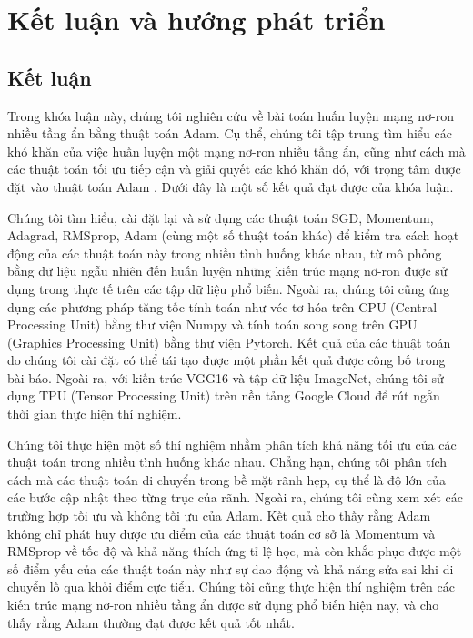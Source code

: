 \chapter{Kết luận và hướng phát triển}
\label{Chapter5}

\section{Kết luận}

Trong khóa luận này, chúng tôi nghiên cứu về bài toán huấn luyện mạng nơ-ron nhiều tầng ẩn bằng thuật toán Adam. Cụ thể, chúng tôi tập trung tìm hiểu các khó khăn của việc huấn luyện một mạng nơ-ron nhiều tầng ẩn, cũng như cách mà các thuật toán tối ưu tiếp cận và giải quyết các khó khăn đó, với trọng tâm được đặt vào thuật toán Adam \cite{kingma2014adam}. Dưới đây là một số kết quả đạt được của khóa luận.

Chúng tôi tìm hiểu, cài đặt lại và sử dụng các thuật toán SGD, Momentum, Adagrad, RMSprop, Adam (cùng một số thuật toán khác) để kiểm tra cách hoạt động của các thuật toán này trong nhiều tình huống khác nhau, từ mô phỏng bằng dữ liệu ngẫu nhiên đến huấn luyện những kiến trúc mạng nơ-ron được sử dụng trong thực tế trên các tập dữ liệu phổ biến. Ngoài ra, chúng tôi cũng ứng dụng các phương pháp tăng tốc tính toán như véc-tơ hóa trên CPU (Central Processing Unit) bằng thư viện Numpy và tính toán song song trên GPU (Graphics Processing Unit) bằng thư viện Pytorch. Kết quả của các thuật toán do chúng tôi cài đặt có thể tái tạo được một phần kết quả được công bố trong bài báo. Ngoài ra, với kiến trúc VGG16 và tập dữ liệu ImageNet, chúng tôi sử dụng TPU (Tensor Processing Unit) trên nền tảng Google Cloud để rút ngắn thời gian thực hiện thí nghiệm.

Chúng tôi thực hiện một số thí nghiệm nhằm phân tích khả năng tối ưu của các thuật toán trong nhiều tình huống khác nhau. Chẳng hạn, chúng tôi phân tích cách mà các thuật toán di chuyển trong bề mặt rãnh hẹp, cụ thể là độ lớn của các bước cập nhật theo từng trục của rãnh. Ngoài ra, chúng tôi cũng xem xét các trường hợp tối ưu và không tối ưu của Adam. Kết quả cho thấy rằng Adam không chỉ phát huy được ưu điểm của các thuật toán cơ sở là Momentum và RMSprop về tốc độ và khả năng thích ứng tỉ lệ học, mà còn khắc phục được một số điểm yếu của các thuật toán này như sự dao động và khả năng sửa sai khi di chuyển lố qua khỏi điểm cực tiểu. Chúng tôi cũng thực hiện thí nghiệm trên các kiến trúc mạng nơ-ron nhiều tầng ẩn được sử dụng phổ biến hiện nay, và cho thấy rằng Adam thường đạt được kết quả tốt nhất.

